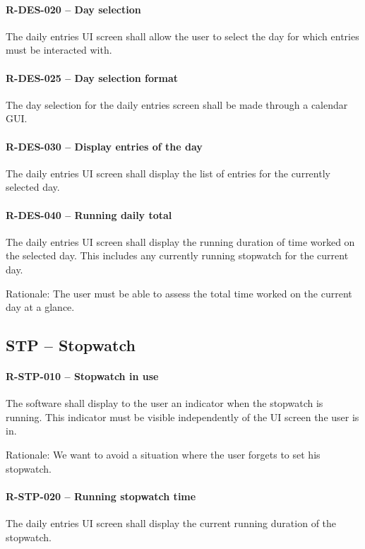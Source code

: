 \paragraph{R-DES-020 -- Day selection}
The daily entries UI screen shall allow the user to select the day for which
entries must be interacted with.

\paragraph{R-DES-025 -- Day selection format}
The day selection for the daily entries screen shall be made through a calendar
GUI.

\paragraph{R-DES-030 -- Display entries of the day}
The daily entries UI screen shall display the list of entries for the currently
selected day.

\paragraph{R-DES-040 -- Running daily total}
The daily entries UI screen shall display the running duration of time worked
on the selected day. This includes any currently running stopwatch for the
current day.

Rationale: The user must be able to assess the total time worked on the current
day at a glance.

\subsection{STP -- Stopwatch}
\paragraph{R-STP-010 -- Stopwatch in use}
The software shall display to the user an indicator when the stopwatch is
running. This indicator must be visible independently of the UI screen
the user is in.

Rationale: We want to avoid a situation where the user forgets to set his
stopwatch.

\paragraph{R-STP-020 -- Running stopwatch time}
The daily entries UI screen shall display the current running duration
of the stopwatch.


